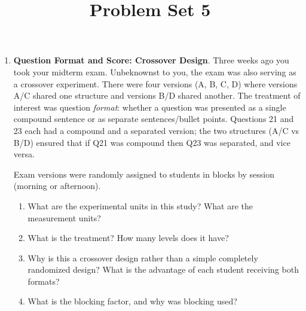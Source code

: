 \documentclass[
  letterpaper,
  DIV=11,
  numbers=noendperiod]{scrartcl}
\title{Problem Set 5}
\author{}
\date{}
\providecommand{\tightlist}{%
  \setlength{\itemsep}{0pt}\setlength{\parskip}{0pt}}
\begin{document}
\maketitle


\begin{enumerate}
\def\labelenumi{\arabic{enumi}.}
\item
  \textbf{Question Format and Score: Crossover Design}. Three weeks ago
  you took your midterm exam. Unbeknownst to you, the exam was also
  serving as a crossover experiment. There were four versions (A, B, C,
  D) where versions A/C shared one structure and versions B/D shared
  another. The treatment of interest was question \emph{format}: whether
  a question was presented as a single compound sentence or as separate
  sentences/bullet points. Questions 21 and 23 each had a compound and a
  separated version; the two structures (A/C vs B/D) ensured that if Q21
  was compound then Q23 was separated, and vice versa.

  Exam versions were randomly assigned to students in blocks by session
  (morning or afternoon).

  \begin{enumerate}
  \def\labelenumii{\alph{enumii}.}
  \tightlist
  \item
    What are the experimental units in this study? What are the
    measurement units?
  \item
    What is the treatment? How many levels does it have?
  \item
    Why is this a crossover design rather than a simple completely
    randomized design? What is the advantage of each student receiving
    both formats?
  \item
    What is the blocking factor, and why was blocking used?
  \end{enumerate}
\end{enumerate}
\end{document}
